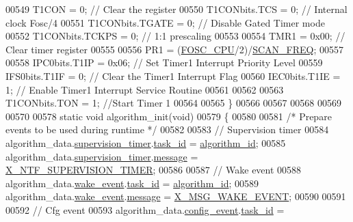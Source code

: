 \begin{DoxyCode}
{{{{{00549     T1CON            = 0;                    \textcolor{comment}{// Clear the register}
00550     T1CONbits.TCS    = 0;                    \textcolor{comment}{// Internal clock Fosc/4}
00551     T1CONbits.TGATE  = 0;                    \textcolor{comment}{// Disable Gated Timer mode}
00552     T1CONbits.TCKPS  = 0;                    \textcolor{comment}{// 1:1 prescaling}
00553 
00554     TMR1             = 0x00;                 \textcolor{comment}{// Clear timer register}
00555 
00556     PR1 = (\hyperlink{a00072_a64b7f2fd4683ad3dcd74ccab1eba40d7}{FOSC\_CPU}/2)/\hyperlink{a00021_a8127170b687c1f67a968886c128e76e4}{SCAN\_FREQ};
00557 
00558     IPC0bits.T1IP    = 0x06;                 \textcolor{comment}{// Set Timer1 Interrupt Priority Level}
00559     IFS0bits.T1IF    = 0;                    \textcolor{comment}{// Clear the Timer1 Interrupt Flag}
00560     IEC0bits.T1IE    = 1;                    \textcolor{comment}{// Enable Timer1 Interrupt Service Routine}
00561 
00562 
00563     T1CONbits.TON    = 1;                    \textcolor{comment}{//Start Timer 1}
00564 
00565 \}
00566 
00567 
00568 
00569 
00570 
00578 \textcolor{keyword}{static} \textcolor{keywordtype}{void} algorithm\_init(\textcolor{keywordtype}{void})
00579 \{
00580 
00581     \textcolor{comment}{/* Prepare events to be used during runtime */}
00582     
00583     \textcolor{comment}{// Supervision timer}
00584     algorithm\_data.\hyperlink{a00016_af13eb2dcaed3eca6506489f8ad8fa768}{supervision\_timer}.\hyperlink{a00036_a21b41e494a28583d4da10f1afb1c5328}{task\_id}                 = 
      \hyperlink{a00038_aff3e3d622fcd96787628167d3c1856f9}{algorithm\_id};
00585     algorithm\_data.\hyperlink{a00016_af13eb2dcaed3eca6506489f8ad8fa768}{supervision\_timer}.\hyperlink{a00036_adf9665938515a20c283eea2c978cf80d}{message}                 = 
      \hyperlink{a00016_aededd1ab0a512a03f6cb0d3459b254e1}{X\_NTF\_SUPERVISION\_TIMER};
00586 
00587    \textcolor{comment}{// Wake event}
00588     algorithm\_data.\hyperlink{a00016_ad6a897cbacf5ae6902272ee198d5cd23}{wake\_event}.\hyperlink{a00036_a21b41e494a28583d4da10f1afb1c5328}{task\_id}                        = 
      \hyperlink{a00038_aff3e3d622fcd96787628167d3c1856f9}{algorithm\_id};
00589     algorithm\_data.\hyperlink{a00016_ad6a897cbacf5ae6902272ee198d5cd23}{wake\_event}.\hyperlink{a00036_adf9665938515a20c283eea2c978cf80d}{message}                        = 
      \hyperlink{a00016_ae6be514b1d949dc71420a3e549772995}{X\_MSG\_WAKE\_EVENT};
00590 
00591 
00592     \textcolor{comment}{// Cfg event}
00593     algorithm\_data.\hyperlink{a00016_a461881ff0583945fd26ee6d5faf8ce1b}{config\_event}.\hyperlink{a00036_a21b41e494a28583d4da10f1afb1c5328}{task\_id}                      = 
}}}}}
\end{DoxyCode}
